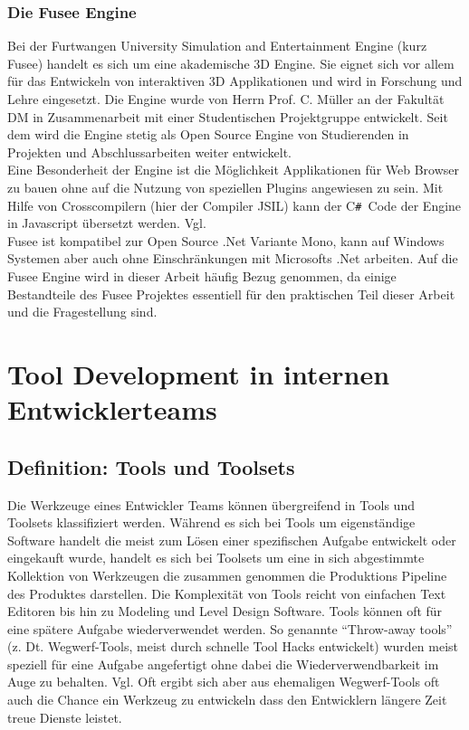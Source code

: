 \documentclass[pagesize, paper=a4, fontsize=12pt, titlepage=true, headings=small, headnosepline, abstractoff, liststotoc, nochapterprefix, plainheadsepline, twoside]{scrreprt}
\newcommand{\CSS}{C\texttt{\# }}
\begin{document}
\subsection{Die Fusee Engine}
Bei der Furtwangen University Simulation and Entertainment Engine (kurz Fusee) handelt es sich um eine akademische 3D Engine. Sie eignet sich vor allem für das Entwickeln von interaktiven 3D Applikationen und wird in Forschung und Lehre eingesetzt. Die Engine wurde von Herrn Prof. C. Müller an der Fakultät DM in Zusammenarbeit mit einer Studentischen Projektgruppe entwickelt. Seit dem wird die Engine stetig als Open Source Engine von Studierenden in Projekten und Abschlussarbeiten weiter entwickelt.\\

Eine Besonderheit der Engine ist die Möglichkeit Applikationen für Web Browser zu bauen ohne auf die Nutzung von speziellen Plugins angewiesen zu sein. Mit Hilfe von Crosscompilern (hier der Compiler JSIL) kann der \CSS Code der Engine in Javascript übersetzt werden. Vgl.  \\

Fusee ist kompatibel zur Open Source .Net Variante Mono, kann auf Windows Systemen aber auch ohne Einschränkungen mit Microsofts .Net arbeiten. Auf die Fusee Engine wird in dieser Arbeit häufig Bezug genommen, da einige Bestandteile des Fusee Projektes essentiell für den praktischen Teil dieser Arbeit und die Fragestellung sind.



\chapter{Tool Development in internen Entwicklerteams}

\section{Definition: Tools und Toolsets}
Die Werkzeuge eines Entwickler Teams können übergreifend in Tools und Toolsets klassifiziert werden. Während es sich bei Tools um eigenständige Software handelt die meist zum Lösen einer spezifischen Aufgabe entwickelt oder eingekauft wurde, handelt es sich bei Toolsets um eine in sich abgestimmte Kollektion von Werkzeugen die zusammen genommen die Produktions Pipeline des Produktes darstellen. Die Komplexität von Tools reicht von einfachen Text Editoren bis hin zu Modeling und Level Design Software.
Tools können oft für eine spätere Aufgabe wiederverwendet werden. So genannte “Throw-away tools” (z. Dt. Wegwerf-Tools, meist durch schnelle Tool Hacks entwickelt) wurden meist speziell für eine Aufgabe angefertigt ohne dabei die Wiederverwendbarkeit im Auge zu behalten. Vgl. \autocite[S. 3]{Wihlidal2006}
Oft ergibt sich aber aus ehemaligen Wegwerf-Tools oft auch die Chance ein Werkzeug zu entwickeln dass den Entwicklern längere Zeit treue Dienste leistet.
\end{document}

